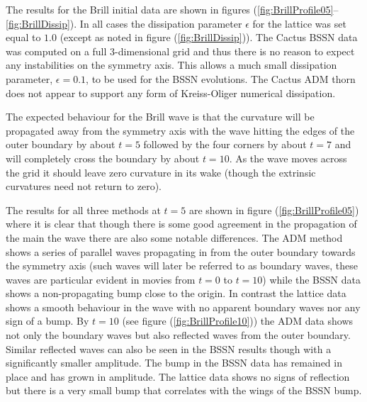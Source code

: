 \documentclass[a4paper,12pt]{article}
\numberwithin{equation}{section}
\begin{document}
The results for the Brill initial data are shown in figures
(\ref{fig:BrillProfile05}--\ref{fig:BrillDissip}). In all cases the dissipation parameter
$\epsilon$ for the lattice was set equal to $1.0$ (except as noted in figure
(\ref{fig:BrillDissip})). The Cactus BSSN data was computed on a full 3-dimensional grid and
thus there is no reason to expect any instabilities on the symmetry axis. This allows a much
small dissipation parameter, $\epsilon=0.1$, to be used for the BSSN evolutions. The Cactus
ADM thorn does not appear to support any form of Kreiss-Oliger numerical dissipation.

The expected behaviour for the Brill wave is that the curvature will be propagated away from
the symmetry axis with the wave hitting the edges of the outer boundary by about $t=5$
followed by the four corners by about $t=7$ and will completely cross the boundary by about
$t=10$. As the wave moves across the grid it should leave zero curvature in its wake (though
the extrinsic curvatures need not return to zero).

The results for all three methods at $t=5$ are shown in figure (\ref{fig:BrillProfile05})
where it is clear that though there is some good agreement in the propagation of the main the
wave there are also some notable differences. The ADM method shows a series of parallel
waves propagating in from the outer boundary towards the symmetry axis (such waves will later
be referred to as boundary waves, these waves are particular evident in movies from $t=0$ to
$t=10$) while the BSSN data shows a non-propagating bump close to the origin. In contrast the
lattice data shows a smooth behaviour in the wave with no apparent boundary waves nor any
sign of a bump. By $t=10$ (see figure (\ref{fig:BrillProfile10})) the ADM data shows not only
the boundary waves but also reflected waves from the outer boundary. Similar reflected waves
can also be seen in the BSSN results though with a significantly smaller amplitude. The bump
in the BSSN data has remained in place and has grown in amplitude. The lattice data shows no
signs of reflection but there is a very small bump that correlates with the wings of the BSSN
bump.

\end{document}

